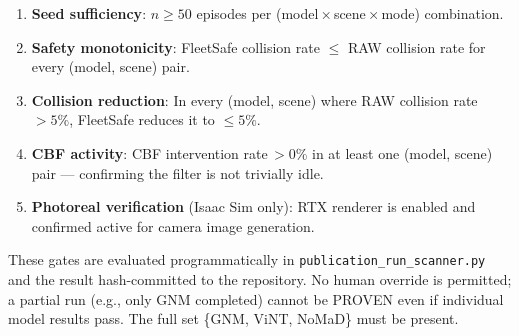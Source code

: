 \documentclass[letterpaper]{article}
\begin{document}
\begin{enumerate}
  \item \textbf{Seed sufficiency}: $n \geq 50$ episodes per
    (model\,×\,scene\,×\,mode) combination.
  \item \textbf{Safety monotonicity}: FleetSafe collision rate $\leq$ RAW
    collision rate for every (model, scene) pair.
  \item \textbf{Collision reduction}: In every (model, scene) where RAW
    collision rate\,$> 5\%$, FleetSafe reduces it to $\leq 5\%$.
  \item \textbf{CBF activity}: CBF intervention rate\,$> 0\%$ in at least
    one (model, scene) pair — confirming the filter is not trivially idle.
  \item \textbf{Photoreal verification} (Isaac Sim only): RTX renderer is
    enabled and confirmed active for camera image generation.
\end{enumerate}

These gates are evaluated programmatically in
\texttt{publication\_run\_scanner.py} and the result hash-committed to the
repository. No human override is permitted; a partial run (e.g., only GNM
completed) cannot be PROVEN even if individual model results pass.
The full set \{GNM, ViNT, NoMaD\} must be present.
\end{document}
